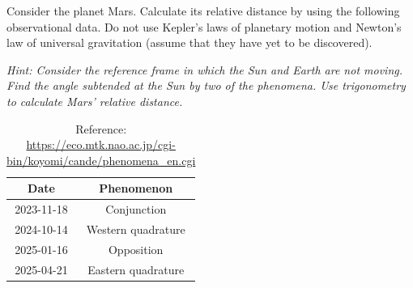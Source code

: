 \documentclass[main.tex]{subfiles}
\begin{document}
\begin{q}{1}
Consider the planet Mars. Calculate its relative distance by using the following
observational data. Do not use Kepler's laws of planetary motion and Newton's
law of universal gravitation (assume that they have yet to be discovered).

\noindent\textit{Hint: Consider the reference frame in which the Sun and Earth
are not moving. Find the angle subtended at the Sun by two of the phenomena. Use
trigonometry to calculate Mars' relative distance.}

\begin{table}[h!]
    \centering
    \begin{tabular}{|c|c|}
    \hline
    \textbf{Date} & \textbf{Phenomenon} \\
    \hline
    2023-11-18 & Conjunction \\
    2024-10-14 & Western quadrature \\
    2025-01-16 & Opposition \\
    2025-04-21 & Eastern quadrature \\
    \hline
    \end{tabular}
    \caption*{Reference:
    \href{https://eco.mtk.nao.ac.jp/cgi-bin/koyomi/cande/phenomena_en.cgi}{https://eco.mtk.nao.ac.jp/cgi-bin/koyomi/cande/phenomena\_en.cgi}}
    \end{table}
\end{q}
\end{document}
